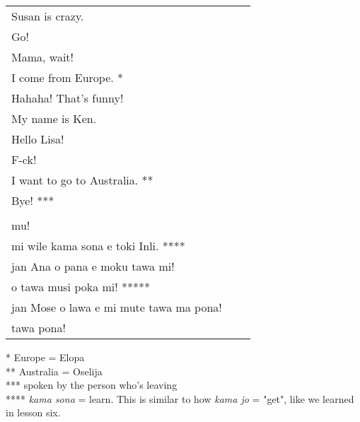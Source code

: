 \begin{supertabular}{p{5,5cm}|ll}
   Susan is crazy. &&   \\ %
   Go!  &&  \\ %
   Mama, wait!  &&  \\ %
   I come from Europe. * &&  \\ %
   Hahaha! That's funny!  &&  \\ %
   My name is Ken. &&  \\  %
   Hello Lisa!  && \\  %
   F-ck!  &&   \\ %
   I want to go to Australia. **  &&  \\  %
   Bye! *** &&   \\ %
 && \\ %
   mu! &&   \\ %
   mi wile kama sona e toki Inli. **** &&  \\ %
   jan Ana o pana e moku tawa mi!  &&  \\ %
   o tawa musi poka mi! ***** &&  \\ %
   jan Mose o lawa e mi mute tawa ma pona! &&   \\ %
   tawa pona!  &&   \\ %
\end{supertabular} 

* Europe = Elopa \\
** Australia = Oselija \\
*** spoken by the person who's leaving \\
****  \textit{kama sona} = learn. This is similar to how \textit{kama jo} = "get", like we learned in lesson six. \\
